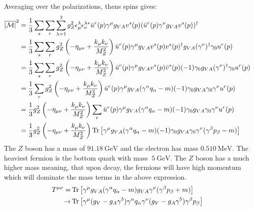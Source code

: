 \documentclass[12pt,a4]{article}
\begin{document}
\begin{enumerate}
\begin{enumerate}
\begin{align*}
        \end{align*}
        Averaging over the polarizations, thens spins gives:
        \begin{align*}
          \overline{|\mathcal{M}|}^2 
                                   &= \frac{1}{3}\sum_{s}\sum_{r}\sum_{\lambda = 1}^{3} g_Z^2 \epsilon_\mu^\lambda \epsilon_\nu^{\lambda *} \bar{u}^r(p) \gamma^\mu g_{V A} v^s(p) ( \bar{u}^r(p) \gamma^\nu g_{V A} v^s(p))^\dagger\\
                                   &= \frac{1}{3}\sum_{s}\sum_{r}g_Z^2 \left(- \eta_{\mu \nu} + \frac{k_\mu k_\nu}{M_Z^2}\right) \bar{u}^r(p) \gamma^\mu g_{V A} v^s(p) v^s(p)^\dagger g_{V A} (\gamma^\nu)^\dagger \gamma_0 u^r(p)   \\
                                   &= \frac{1}{3}\sum_{s}\sum_{r}g_Z^2 \left(- \eta_{\mu \nu} + \frac{k_\mu k_\nu}{M_Z^2}\right) \bar{u}^r(p) \gamma^\mu g_{V A} v^s(p) \bar{v}^s(p)(-1)\gamma_0 g_{V A} (\gamma^\nu)^\dagger \gamma_0 u^r(p)   \\
                                   &= \frac{1}{3}\sum_{r}g_Z^2 \left(- \eta_{\mu \nu} + \frac{k_\mu k_\nu}{M_Z^2}\right) \bar{u}^r(p) \gamma^\mu g_{V A} (\gamma^\alpha q_\alpha - m)(-1)\gamma_0 g_{V A} \gamma_0\gamma^\nu  u^r(p)   \\
                                   &= \frac{1}{3}g_Z^2 \left(- \eta_{\mu \nu} + \frac{k_\mu k_\nu}{M_Z^2}\right) \sum_{r}\bar{u}^r(p) \gamma^\mu g_{V A} (\gamma^\alpha q_\alpha - m)(-1)\gamma_0 g_{V A} \gamma_0 \gamma^\nu u^r(p)   \\
                                   &= \frac{1}{3}g_Z^2 \left(- \eta_{\mu \nu} + \frac{k_\mu k_\nu}{M_Z^2}\right) \Tr\left[\gamma^\mu g_{V A} (\gamma^\alpha q_\alpha - m)(-1)\gamma_0 g_{V A} \gamma_0 \gamma^\nu(\gamma^\beta p_\beta - m) \right]  \\
        \end{align*}
        The $Z$ boson has a mass of $\SI{91.18}{\giga \eV}$ and the electron has mass $\SI{0.510}{\mega \eV}$. 
        The heaviest fermion is the bottom quark with mass $~ \SI{5}{\giga \eV}$.
        The $Z$ boson has a much higher mass meaning, that upon decay, the fermions will have high momentum which will dominate the mass terms in the above expression.
        \begin{align*}
          T^{\mu\nu}  =& \Tr\left[\gamma^\mu g_{VA} (\gamma^\alpha q_\alpha - m) g_{VA} \gamma^\nu (\gamma^\beta p_\beta + m) \right]\\
                   \to & \Tr\left[\gamma^\mu (g_V - g_A \gamma^5) \gamma^\alpha q_\alpha \gamma^\nu (g_V - g_A \gamma^5) \gamma^\beta p_\beta \right]\\

\end{align*}
\end{enumerate}
\end{enumerate}
\end{document}
